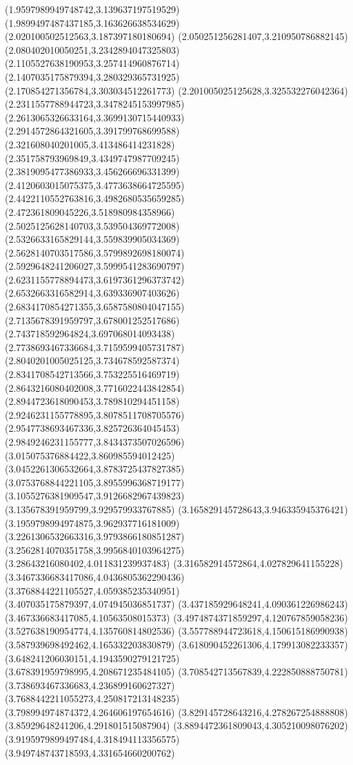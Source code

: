 {(1.9597989949748742,3.139637197519529)
(1.9899497487437185,3.163626638534629)
(2.020100502512563,3.187397180180694)
(2.050251256281407,3.210950786882145)
(2.080402010050251,3.2342894047325803)
(2.1105527638190953,3.257414960876714)
(2.1407035175879394,3.280329365731925)
(2.170854271356784,3.303034512261773)
(2.201005025125628,3.325532276042364)
(2.2311557788944723,3.3478245153997985)
(2.2613065326633164,3.3699130715440933)
(2.2914572864321605,3.391799768699588)
(2.321608040201005,3.413486414231828)
(2.351758793969849,3.4349747987709245)
(2.3819095477386933,3.456266696331399)
(2.4120603015075375,3.4773638664725595)
(2.4422110552763816,3.4982680535659285)
(2.472361809045226,3.518980984358966)
(2.5025125628140703,3.539504369772008)
(2.5326633165829144,3.559839905034369)
(2.5628140703517586,3.5799892698180074)
(2.5929648241206027,3.5999541283690797)
(2.6231155778894473,3.6197361296373742)
(2.6532663316582914,3.639336907403626)
(2.6834170854271355,3.6587580804047155)
(2.7135678391959797,3.678001252517686)
(2.743718592964824,3.697068014093438)
(2.7738693467336684,3.7159599405731787)
(2.8040201005025125,3.734678592587374)
(2.8341708542713566,3.753225516469719)
(2.8643216080402008,3.7716022443842854)
(2.8944723618090453,3.789810294451158)
(2.9246231155778895,3.8078511708705576)
(2.9547738693467336,3.825726364045453)
(2.9849246231155777,3.8434373507026596)
(3.015075376884422,3.860985594012425)
(3.0452261306532664,3.8783725437827385)
(3.0753768844221105,3.8955996368719177)
(3.1055276381909547,3.9126682967439823)
(3.135678391959799,3.929579933767885)
(3.165829145728643,3.946335945376421)
(3.1959798994974875,3.962937716181009)
(3.2261306532663316,3.9793866180851287)
(3.2562814070351758,3.9956840103964275)
(3.28643216080402,4.011831239937483)
(3.316582914572864,4.027829641155228)
(3.3467336683417086,4.0436805362290436)
(3.3768844221105527,4.059385235340951)
(3.407035175879397,4.074945036851737)
(3.437185929648241,4.090361226986243)
(3.467336683417085,4.10563508015373)
(3.4974874371859297,4.120767859058236)
(3.527638190954774,4.135760814802536)
(3.557788944723618,4.150615186990938)
(3.587939698492462,4.165332203830879)
(3.618090452261306,4.179913082233357)
(3.648241206030151,4.1943590279121725)
(3.678391959798995,4.208671235484105)
(3.708542713567839,4.222850888750781)
(3.738693467336683,4.236899160627327)
(3.7688442211055273,4.250817213148235)
(3.798994974874372,4.264606197654616)
(3.829145728643216,4.278267254888808)
(3.85929648241206,4.291801515087904)
(3.8894472361809043,4.305210098076202)
(3.9195979899497484,4.318494113356575)
(3.949748743718593,4.331654660200762)
}
